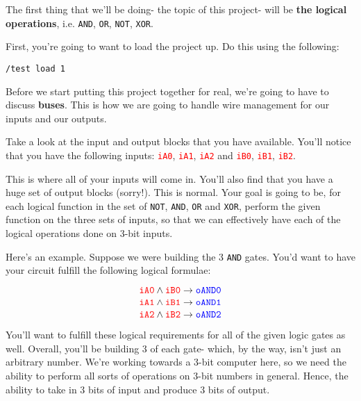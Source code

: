 \documentclass{article}
\newcommand{\varin}[1]{\textcolor{red}{\texttt{#1}}}
\newcommand{\varout}[1]{\textcolor{blue}{\texttt{#1}}}
\begin{document}
The first thing that we'll be doing- the topic of this project- will be \textbf{the logical operations}, i.e. \texttt{AND}, \texttt{OR}, \texttt{NOT}, \texttt{XOR}.

First, you're going to want to load the project up. Do this using the following:

\begin{tcolorbox}
  \texttt{/test load 1}
\end{tcolorbox}

Before we start putting this project together for real, we're going to have to discuss \textbf{buses}. This is how we are going to handle wire management for our inputs and our outputs.

Take a look at the input and output blocks that you have available. You'll notice that you have the following inputs: \varin{iA0}, \varin{iA1}, \varin{iA2} and \varin{iB0}, \varin{iB1}, \varin{iB2}.

This is where all of your inputs will come in. You'll also find that you have a huge set of output blocks (sorry!). This is normal. Your goal is going to be, for each logical function in the set of \texttt{NOT}, \texttt{AND}, \texttt{OR} and \texttt{XOR}, perform the given function on the three sets of inputs, so that we can effectively have each of the logical operations done on 3-bit inputs.

Here's an example. Suppose we were building the 3 \texttt{AND} gates. 
You'd want to have your circuit fulfill the following logical formulae:

\begin{tcolorbox}
  \texttt{$$ \varin{iA0} \land \varin{iB0} \rightarrow \varout{oAND0} $$}
  \texttt{$$ \varin{iA1} \land \varin{iB1} \rightarrow \varout{oAND1} $$}
  \texttt{$$ \varin{iA2} \land \varin{iB2} \rightarrow \varout{oAND2} $$}
\end{tcolorbox}

You'll want to fulfill these logical requirements for all of the given logic gates as well. Overall, you'll be building 3 of each gate- which, by the way, isn't just an arbitrary number. We're working towards a 3-bit computer here, so we need the ability to perform all sorts of operations on 3-bit numbers in general. Hence, the ability to take in 3 bits of input and produce 3 bits of output.

\section{\selectfont{Schematics}}
\end{document}
